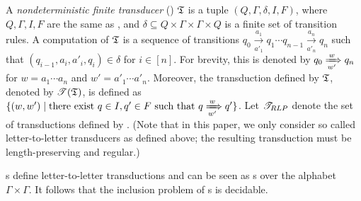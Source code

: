 A \emph{nondeterministic finite transducer} (\NFT) ${\mathfrak{T} }$ is a tuple $(Q, \Gamma, \delta, I, F)$, 
where $Q, \Gamma, I, F$ are the same as \NFA, %
and %
$\delta \subseteq Q \times \Gamma \times \Gamma \times Q$ is a finite set of transition rules.
%
A computation of ${\mathfrak{T} }$ is a sequence of transitions
$
q_0 \xrightarrow[a'_1]{a_1} q_1  %
\cdots q_{n-1} \xrightarrow[a'_n]{a_n} q_n 
$
such that $(q_{i-1}, a_i, a'_i, q_i) \in \delta$ for $i \in [n]$. For brevity, this is denoted by  $q_0 \xRightarrow[w']{w} q_n$ for $w= a_1 \cdots a_n$ and $w'= a'_1 \cdots a'_n$. %
Moreover, the transduction defined by ${\mathfrak{T} }$, denoted by ${\mathscr{T} }({\mathfrak{T} })$, is defined as $\{(w, w') \mid \mbox{there exist } q \in I, q' \in F \mbox{ such that } q \xRightarrow[w']{w} q'\}$. Let ${\mathscr{T}_{RLP} }$ denote the set of transductions defined by \NFT. (Note that in this paper, we only consider so called letter-to-letter transducers as defined above; the resulting transduction must be length-preserving and regular.)
%


{\NFT}s define letter-to-letter transductions and can be seen as {\NFA}s over the alphabet $\Gamma \times \Gamma$. It follows that the inclusion problem of {\NFT}s is decidable.

